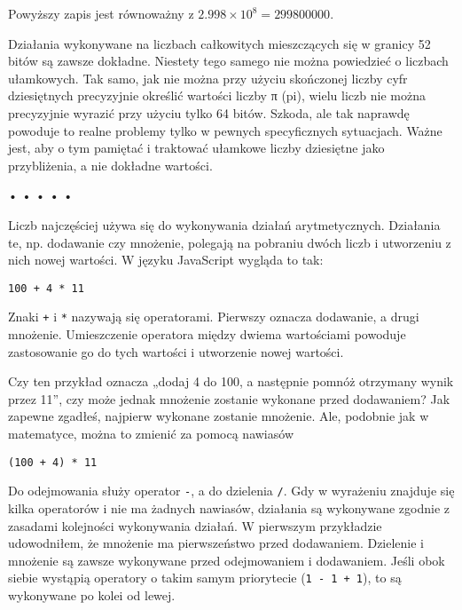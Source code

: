 Powyższy zapis jest równoważny z $2.998 \times 10^{8} = 299800000$.

    
Działania wykonywane na liczbach całkowitych mieszczących się w granicy 52 bitów są zawsze dokładne. Niestety tego samego nie można powiedzieć o liczbach ułamkowych. Tak samo, jak nie można przy użyciu skończonej liczby cyfr dziesiętnych precyzyjnie określić wartości liczby π (pi), wielu liczb nie można precyzyjnie wyrazić przy użyciu tylko 64 bitów. Szkoda, ale tak naprawdę powoduje to realne problemy tylko w pewnych specyficznych sytuacjach. Ważne jest, aby o tym pamiętać i traktować ułamkowe liczby dziesiętne jako przybliżenia, a nie dokładne wartości.

  
  \begin{center}
• • • • •
\end{center}
  
    
Liczb najczęściej używa się do wykonywania działań arytmetycznych. Działania te, np. dodawanie czy mnożenie, polegają na pobraniu dwóch liczb i utworzeniu z nich nowej wartości. W języku JavaScript wygląda to tak:

\begin{verbatim} 
100 + 4 * 11
\end{verbatim}
    
Znaki \texttt{+}\index{+} i \texttt{*}\index{*} nazywają się operatorami. Pierwszy oznacza dodawanie, a drugi mnożenie. Umieszczenie operatora między dwiema wartościami powoduje zastosowanie go do tych wartości i utworzenie nowej wartości.

    
Czy ten przykład oznacza „dodaj 4 do 100, a następnie pomnóż otrzymany wynik przez 11”, czy może jednak mnożenie zostanie wykonane przed dodawaniem? Jak zapewne zgadłeś, najpierw wykonane zostanie mnożenie. Ale, podobnie jak w matematyce, można to zmienić za pomocą nawiasów\index{()}

\begin{verbatim} 
(100 + 4) * 11
\end{verbatim}
    
Do odejmowania służy operator \texttt{-}\index{$-$}, a do dzielenia \texttt{/}\index{/}. Gdy w wyrażeniu znajduje się kilka operatorów i nie ma żadnych nawiasów, działania są wykonywane zgodnie z zasadami kolejności wykonywania działań. W pierwszym przykładzie udowodniłem, że mnożenie ma pierwszeństwo przed dodawaniem. Dzielenie i mnożenie są zawsze wykonywane przed odejmowaniem i dodawaniem. Jeśli obok siebie wystąpią operatory o takim samym priorytecie (\texttt{1 - 1 + 1}), to są  wykonywane po kolei od lewej.

